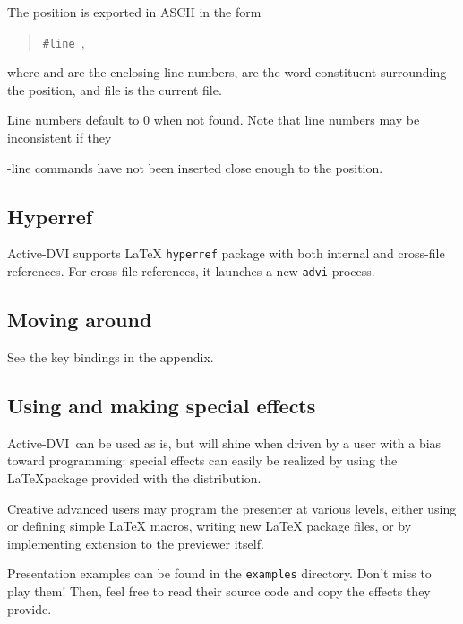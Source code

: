 \documentclass[12pt]{article}
\def \ActiveDVI {Active-DVI}
\begin{document}
The position is exported in ASCII in the form
\begin{quote}
\verb"#line ",  
\doctt {<<}\doctt{>><<}\doctt{>>}
\end{quote}
where  and   are the enclosing line numbers, 
 are the word constituent surrounding the
position, and  file is the current file. 

Line numbers default to $0$ when not found. Note that line numbers may be
inconsistent if they \docdef \special-line commands have not been inserted
close enough to the position.

\subsection {Hyperref}

{\ActiveDVI} supports {\LaTeX} {\tt hyperref} package 
with both internal and cross-file references. For cross-file
references, it launches a new \verb"advi" process. 


\subsection {Moving around}

See the key bindings in the appendix.

\subsection {Using and making special effects}

\ActiveDVI~can be used as is, but will shine when driven by a user
with a bias toward programming: special effects can easily 
be realized by using the \LaTeX package provided with the distribution. 

Creative advanced users may program the presenter at various levels, either
using or defining simple {\LaTeX} macros, writing new {\LaTeX} package
files, or by implementing extension to the previewer itself.

Presentation examples can be found in the 
\verb"examples" directory. Don't miss to play them! Then, feel free
to read their source code and copy the effects they provide.

\end{document}

